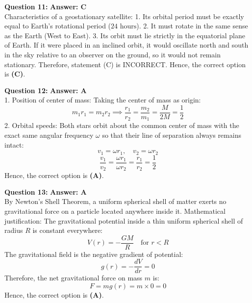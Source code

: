 \documentclass[11pt,a4paper]{article}
\begin{document}
\begin{tcolorbox}[solbox]
  \textbf{\textcolor{primaryDark}{Question 11:}} \hfill \textbf{\textcolor{l1Green}{Answer: C}}\\
  \vspace{3pt}
  Characteristics of a geostationary satellite:
1. Its orbital period must be exactly equal to Earth's rotational period ($24\text{ hours}$).
2. It must rotate in the same sense as the Earth (West to East).
3. Its orbit must lie strictly in the equatorial plane of Earth. If it were placed in an inclined orbit, it would oscillate north and south in the sky relative to an observer on the ground, so it would not remain stationary.
\vspace{3pt}
Therefore, statement (C) is INCORRECT.
Hence, the correct option is \textbf{(C)}.
\end{tcolorbox}
\vspace{3pt}

\begin{tcolorbox}[solbox]
  \textbf{\textcolor{primaryDark}{Question 12:}} \hfill \textbf{\textcolor{l1Green}{Answer: A}}\\
  \vspace{3pt}
  1. Position of center of mass:
Taking the center of mass as origin:
$$m_1 r_1 = m_2 r_2 \implies \frac{r_1}{r_2} = \frac{m_2}{m_1} = \frac{M}{2M} = \frac{1}{2}$$
\vspace{3pt}
2. Orbital speeds:
Both stars orbit about the common center of mass with the exact same angular frequency $\omega$ so that their line of separation always remains intact:
$$v_1 = \omega r_1, \quad v_2 = \omega r_2$$
$$\frac{v_1}{v_2} = \frac{\omega r_1}{\omega r_2} = \frac{r_1}{r_2} = \frac{1}{2}$$
\vspace{3pt}
Hence, the correct option is \textbf{(A)}.
\end{tcolorbox}
\vspace{3pt}

\begin{tcolorbox}[solbox]
  \textbf{\textcolor{primaryDark}{Question 13:}} \hfill \textbf{\textcolor{l1Green}{Answer: A}}\\
  \vspace{3pt}
  By Newton's Shell Theorem, a uniform spherical shell of matter exerts no gravitational force on a particle located anywhere inside it.
\vspace{3pt}
Mathematical justification:
The gravitational potential inside a thin uniform spherical shell of radius $R$ is constant everywhere:
$$V(r) = -\frac{GM}{R} \quad \text{for } r < R$$
\vspace{3pt}
The gravitational field is the negative gradient of potential:
$$g(r) = -\frac{dV}{dr} = 0$$
\vspace{3pt}
Therefore, the net gravitational force on mass $m$ is:
$$F = m g(r) = m \times 0 = 0$$
\vspace{3pt}
Hence, the correct option is \textbf{(A)}.
\end{tcolorbox}
\vspace{3pt}
\end{document}

